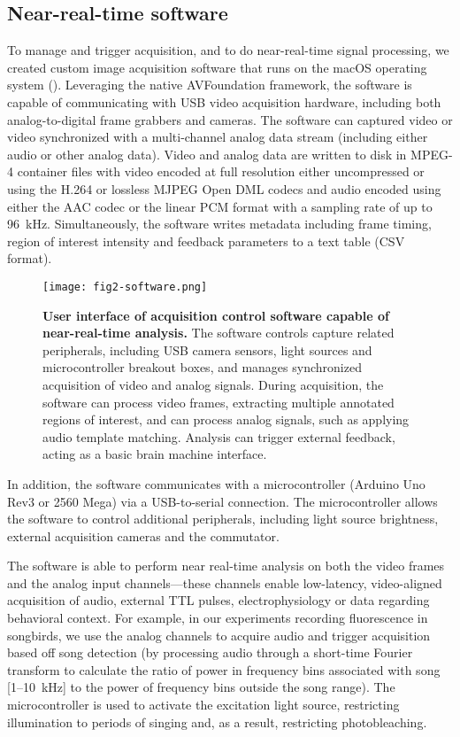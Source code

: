 
\subsection{Near-real-time software}

To manage and trigger acquisition, and to do near-real-time signal
processing, we created custom image acquisition software that runs
on the macOS operating system (). Leveraging the 
native AVFoundation
framework, the software is capable of communicating with USB video 
acquisition hardware, including both analog-to-digital frame 
grabbers and cameras. The software can captured video or video 
synchronized with a multi-channel analog data stream (including 
either audio or other analog data). Video and analog data are 
written to disk in MPEG-4 container files with video encoded at 
full resolution either uncompressed or using the H.264 or lossless 
MJPEG Open DML codecs and audio encoded using either the AAC codec 
or the linear PCM format with a sampling rate of up to 
96~\si{\kilo\hertz}. Simultaneously, the software writes metadata 
including frame timing, region of interest intensity and feedback 
parameters to a text table (CSV format).

\begin{figure}
\texttt{[image: fig2-software.png]}
\caption[Software for capture near-real-time analysis]{\textbf{User interface of acquisition
control software capable of near-real-time analysis.} The software 
controls capture related peripherals, including USB camera sensors,
light sources and microcontroller breakout boxes, and manages 
synchronized acquisition of video and analog signals. During 
acquisition, the software can process video frames, extracting 
multiple annotated regions of interest, and can process analog 
signals, such as applying audio template matching. Analysis 
can trigger external feedback, acting as a basic brain machine 
interface.}
\label{fig:software}
\end{figure}

In addition, the software communicates with a microcontroller 
(Arduino Uno Rev3 or 2560 Mega) via a USB-to-serial connection. The 
microcontroller allows the software to control additional 
peripherals, including light source brightness, external acquisition 
cameras and the commutator.

The software is able to perform near real-time analysis on both the 
video frames and the analog input channels---these channels enable
low-latency, video-aligned acquisition of audio, external TTL 
pulses, electrophysiology or data regarding behavioral context. 
For example, in our experiments recording fluorescence in songbirds, 
we use the analog channels to acquire audio and trigger acquisition 
based off song detection (by processing audio through a short-time
Fourier transform to calculate the ratio of power in frequency 
bins associated with song [1--10~kHz] to the power of frequency bins outside 
the song range). The microcontroller is used to activate 
the excitation light source, restricting illumination to periods of 
singing and, as a result, restricting photobleaching. 

